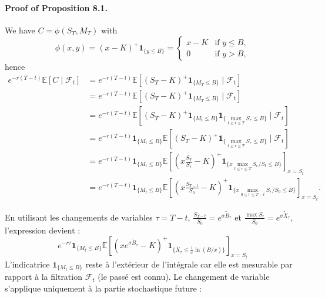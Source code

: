 \documentclass[11pt]{article}
\begin{document}
\paragraph{Proof of Proposition 8.1.} We have $C = \phi(S_T, M_T)$ with
\begin{equation*}
\phi(x, y) = (x - K)^+ \mathbf{1}_{\{y \le B\}} = \begin{cases} 
x - K & \text{if } y \le B, \\
0 & \text{if } y > B,
\end{cases}
\end{equation*}
hence
\begin{align}
e^{-r(T-t)} \mathbb{E} \left[ C \mid \mathcal{F}_t \right] &= e^{-r(T-t)} \mathbb{E} \left[ (S_T - K)^+ \mathbf{1}_{\{M_T \le B\}} \mid \mathcal{F}_t \right] \nonumber \\
&= e^{-r(T-t)} \mathbb{E} \left[ (S_T - K)^+ \mathbf{1}_{\{M_T \le B\}} \mid \mathcal{F}_t \right] \nonumber \\
&= e^{-r(T-t)} \mathbb{E} \left[ (S_T - K)^+ \mathbf{1}_{\{M_t \le B\}} \mathbf{1}_{\{ \max_{t \le r \le T} S_r \le B \}} \mid \mathcal{F}_t \right] \nonumber \\
&= e^{-r(T-t)} \mathbf{1}_{\{M_t \le B\}} \mathbb{E} \left[ (S_T - K)^+ \mathbf{1}_{\{ \max_{t \le r \le T} S_r \le B \}} \mid \mathcal{F}_t \right] \nonumber \\
&= e^{-r(T-t)} \mathbf{1}_{\{M_t \le B\}} \mathbb{E} \left[ \left( x \frac{S_T}{S_t} - K \right)^+ \mathbf{1}_{\{ x \max_{t \le r \le T} S_r / S_t \le B \}} \right]_{x=S_t} \nonumber \\
&= e^{-r(T-t)} \mathbf{1}_{\{M_t \le B\}} \mathbb{E} \left[ \left( x \frac{S_{T-t}}{S_0} - K \right)^+ \mathbf{1}_{\{ x \max_{0 \le r \le T-t} S_r / S_0 \le B \}} \right]_{x=S_t}.
\end{align}

En utilisant les changements de variables $\tau = T-t$, $\frac{S_{T-t}}{S_0} = e^{\sigma \tilde{B}_\tau}$ et $\frac{\max S_r}{S_0} = e^{\sigma \tilde{X}_\tau}$, l'expression devient :
\begin{equation}
e^{-r\tau} \mathbf{1}_{\{M_t \le B\}} \mathbb{E} \left[ \left( x e^{\sigma \tilde{B}_\tau} - K \right)^+ \mathbf{1}_{\{ \tilde{X}_\tau \le \frac{1}{\sigma} \ln(B/x) \}} \right]_{x=S_t}
\end{equation}
L'indicatrice $\mathbf{1}_{\{M_t \le B\}}$ reste à l'extérieur de l'intégrale car elle est mesurable par rapport à la filtration $\mathcal{F}_t$ (le passé est connu). Le changement de variable s'applique uniquement à la partie stochastique future :
\end{document}
